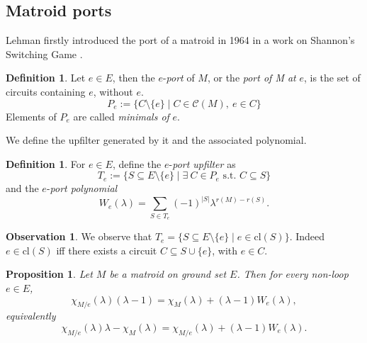 \documentclass[11pt,a4paper]{article}
\newtheorem{proposition}[theorem]{Proposition}
\theoremstyle{definition}
\newtheorem{definition}[theorem]{Definition}
\newtheorem{observation}[theorem]{Observation}
\begin{document}
\subsection{Matroid ports}\label{subsec:ports}

Lehman firstly introduced the port of a matroid in 1964 in a work on Shannon's Switching Game \cite{port}.
\begin{definition}
    Let $e \in E$, then the $e$-\emph{port} of $M$, or the \emph{port of M at} $e$, is the set of circuits containing $e$, without $e$. \[P_e := \{ C \setminus \{e\} \mid C \in \mathcal{C}(M), \ e \in C\}\]
    Elements of $P_e$ are called \emph{minimals of} $e$.  
\end{definition}

We define the upfilter generated by it and the associated polynomial.
\begin{definition}
For $e \in E$, define the $e$-\emph{port upfilter} as \[T_e := \{ S \subseteq E \setminus \{e\} \mid \exists  \ C \in P_e \text{ s.t. } C \subseteq S\} \] and the $e$-\emph{port polynomial}
\[
W_e(\lambda) = \sum_{S \in T_e} (-1)^{|S|} \lambda^{r(M) - r(S)}.
\]
\end{definition}

\begin{observation} \label{obs:Te-cl} 
    We observe that $T_e = \{ S \subseteq E \setminus \{e\} \mid e \in \mathrm{cl}(S)\}$. Indeed $e \in \mathrm{cl}(S)$ iff there exists a circuit $C \subseteq S \cup \{e\}$, with $e \in C$.
\end{observation}

\begin{proposition}\label{We}
Let $M$ be a matroid on ground set $E$. Then for every non-loop $e \in E$,
\begin{equation*}
    \chi_{M/e}(\lambda)(\lambda - 1)= \chi_M(\lambda) + (\lambda - 1) W_e(\lambda),
\end{equation*} equivalently
\begin{equation}\label{eq:We}
  \chi_{M/e}(\lambda)\lambda - \chi_M(\lambda) = \chi_{M/e}(\lambda) + (\lambda - 1) W_e(\lambda).    
\end{equation}
\end{proposition}
\end{document}
